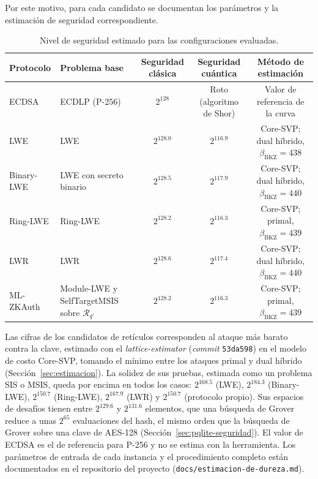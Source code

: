 Por este motivo, para cada candidato se documentan los parámetros y la estimación de
seguridad correspondiente.

\begin{table}[H]
\centering
\caption{Nivel de seguridad estimado para las configuraciones evaluadas.}
\label{tab:security-levels}
\small
\begin{tabularx}{\textwidth}{lYCCC}
\toprule
\textbf{Protocolo} &
\textbf{Problema base} &
\textbf{Seguridad clásica} &
\textbf{Seguridad cuántica} &
\textbf{Método de estimación} \\
\midrule

ECDSA &
ECDLP (P-256) &
$2^{128}$ &
Roto (algoritmo de Shor) &
Valor de referencia de la curva \\

LWE &
LWE &
$2^{128.0}$ &
$2^{116.9}$ &
Core-SVP; dual híbrido, $\beta_{\mathrm{BKZ}} = 438$ \\

Binary-LWE &
LWE con secreto binario &
$2^{128.5}$ &
$2^{117.9}$ &
Core-SVP; dual híbrido, $\beta_{\mathrm{BKZ}} = 440$ \\

Ring-LWE &
Ring-LWE &
$2^{128.2}$ &
$2^{116.3}$ &
Core-SVP; primal, $\beta_{\mathrm{BKZ}} = 439$ \\

LWR &
LWR &
$2^{128.6}$ &
$2^{117.4}$ &
Core-SVP; dual híbrido, $\beta_{\mathrm{BKZ}} = 440$ \\

ML-ZKAuth &
Module-LWE y SelfTargetMSIS sobre $\mathcal{R}_{q'}$ &
$2^{128.2}$ &
$2^{116.3}$ &
Core-SVP; primal, $\beta_{\mathrm{BKZ}} = 439$ \\

\bottomrule
\end{tabularx}
\end{table}

Las cifras de los candidatos de retículos corresponden al ataque más barato contra la
clave, estimado con el \textit{lattice-estimator} (\textit{commit} \texttt{53da598}) en el modelo
de costo Core-SVP, tomando el mínimo entre los ataques primal y dual híbrido
(Sección~\ref{sec:estimacion}). La solidez de sus pruebas, estimada como un problema SIS
o MSIS, queda por encima en todos los casos: $2^{168.5}$ (LWE), $2^{184.3}$ (Binary-LWE),
$2^{150.7}$ (Ring-LWE), $2^{167.9}$ (LWR) y $2^{150.7}$ (protocolo propio). Sus espacios de
desafíos tienen entre $2^{129.6}$ y $2^{131.6}$ elementos, que una búsqueda de Grover reduce
a unas $2^{65}$ evaluaciones del hash, el mismo orden que la búsqueda de Grover sobre una
clave de AES-128 (Sección~\ref{sec:pqlite-seguridad}). El valor de ECDSA es el de referencia
para P-256 y no se estima con la herramienta. Los parámetros de entrada de cada instancia y
el procedimiento completo están documentados en el repositorio del proyecto
(\texttt{docs/estimacion-de-dureza.md}).


